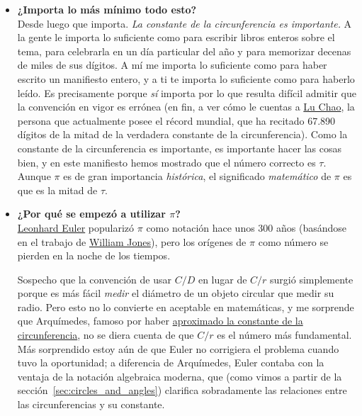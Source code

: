 \begin{itemize}
  \item \textbf{¿Importa lo más mínimo todo esto?} \\ Desde luego que importa. \emph{La constante de la circunferencia es importante.} A la gente le importa lo suficiente como para escribir libros enteros sobre el tema, para celebrarla en un día particular del año y para memorizar decenas de miles de sus dígitos. A mí me importa lo suficiente como para haber escrito un manifiesto entero, y a ti te importa lo suficiente como para haberlo leído. Es precisamente porque \emph{sí} importa por lo que resulta difícil admitir que la convención en vigor es errónea (en fin, a ver cómo le cuentas a
\href{https://en.wikipedia.org/wiki/Lu_Chao}{Lu Chao}, la persona que actualmente posee el récord mundial, que ha recitado 67.890 dígitos de la mitad de la verdadera constante de la circunferencia).
  Como la constante de la circunferencia es importante, es importante hacer las cosas bien, y en este manifiesto hemos mostrado que el número correcto es $\tau$. Aunque $\pi$ es de gran importancia \emph{histórica}, el significado \emph{matemático} de $\pi$ es que es la mitad de $\tau$.


  \item \textbf{¿Por qué se empezó a utilizar $\pi$?} \\ \href{https://es.wikipedia.org/wiki/Leonhard_Euler}{Leonhard Euler} popularizó $\pi$ como notación hace unos 300 años (basándose en el trabajo de \href{https://es.wikipedia.org/wiki/William_Jones_(matemático)}{William Jones}), pero los orígenes de $\pi$ como número se pierden en la noche de los tiempos. 

Sospecho que la convención de usar $C/D$ en lugar de $C/r$ surgió simplemente porque es más fácil \emph{medir} el diámetro de un objeto circular que medir su radio. Pero esto no lo convierte en aceptable en matemáticas, y me sorprende que Arquímedes, famoso por haber \href{http://itech.fgcu.edu/faculty/clindsey/mhf4404/archimedes/archimedes.html}{aproximado la constante de la circunferencia}, no se diera cuenta de que $C/r$ es el número más fundamental. Más sorprendido estoy aún de que Euler no corrigiera el problema cuando tuvo la oportunidad; a diferencia de Arquímedes, Euler contaba con la ventaja de la notación algebraica moderna, que (como vimos a partir de la sección~\ref{sec:circles_and_angles}) clarifica sobradamente las relaciones entre las circunferencias y su constante.



\end{itemize}

